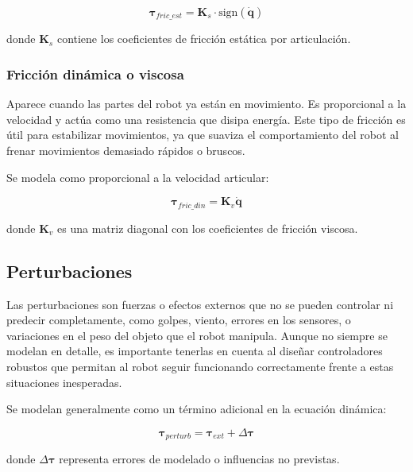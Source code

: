 \begin{equation}
	\boldsymbol{\tau}_{fric\_est} = \mathbf{K}_s \cdot \text{sign}(\dot{\mathbf{q}})
\end{equation}

donde \(\mathbf{K}_s\) contiene los coeficientes de fricción estática por articulación.

\subsubsection{Fricción dinámica o viscosa}

 Aparece cuando las partes del robot ya están en movimiento. Es proporcional a la velocidad y actúa como una resistencia que disipa energía. Este tipo de fricción es útil para estabilizar movimientos, ya que suaviza el comportamiento del robot al frenar movimientos demasiado rápidos o bruscos.

Se modela como proporcional a la velocidad articular:

\begin{equation}
	\boldsymbol{\tau}_{fric\_din} = \mathbf{K}_v \dot{\mathbf{q}}
\end{equation}

donde \(\mathbf{K}_v\) es una matriz diagonal con los coeficientes de fricción viscosa.



\subsection{Perturbaciones}

Las perturbaciones son fuerzas o efectos externos que no se pueden controlar ni predecir completamente, como golpes, viento, errores en los sensores, o variaciones en el peso del objeto que el robot manipula. Aunque no siempre se modelan en detalle, es importante tenerlas en cuenta al diseñar controladores robustos que permitan al robot seguir funcionando correctamente frente a estas situaciones inesperadas.


Se modelan generalmente como un término adicional en la ecuación dinámica:

\begin{equation}
	\boldsymbol{\tau}_{perturb} = \boldsymbol{\tau}_{ext} + \Delta\boldsymbol{\tau}
\end{equation}

donde \(\Delta\boldsymbol{\tau}\) representa errores de modelado o influencias no previstas. 
